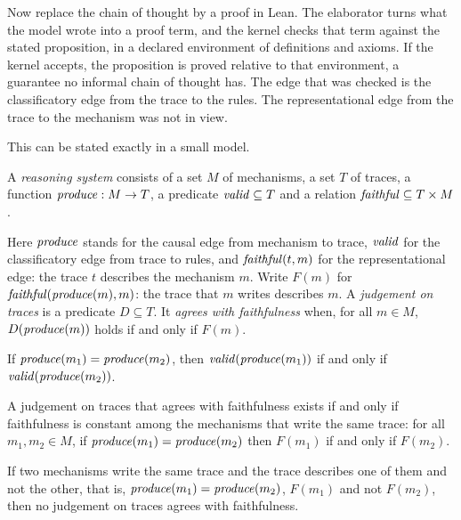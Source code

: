 Now replace the chain of thought by a proof in Lean. The elaborator turns what the model
wrote into a proof term, and the kernel checks that term against the stated proposition,
in a declared environment of definitions and axioms. If the kernel accepts, the
proposition is proved relative to that environment, a guarantee no informal chain of
thought has. The edge that was checked is the classificatory edge from the trace to the
rules. The representational edge from the trace to the mechanism was not in view.

This can be stated exactly in a small model.

\begin{definition}
\label{def:rs}
A \emph{reasoning system} consists of a set $M$ of mechanisms, a set $T$ of traces, a
function $\mathit{produce} : M \to T$, a predicate $\mathit{valid} \subseteq T$ and a relation
$\mathit{faithful} \subseteq T \times M$.
\end{definition}

\noindent
Here $\mathit{produce}$ stands for the causal edge from mechanism to trace, $\mathit{valid}$ for the
classificatory edge from trace to rules, and $\mathit{faithful}(t,m)$ for the representational
edge: the trace $t$ describes the mechanism $m$. Write $F(m)$ for
$\mathit{faithful}(\mathit{produce}(m), m)$: the trace that $m$ writes describes $m$. A \emph{judgement
on traces} is a predicate $D \subseteq T$. It \emph{agrees with faithfulness} when, for
all $m \in M$, $D(\mathit{produce}(m))$ holds if and only if $F(m)$.

\begin{proposition}
\label{prop:blind}
If $\mathit{produce}(m_1) = \mathit{produce}(m_2)$, then $\mathit{valid}(\mathit{produce}(m_1))$ if and only if
$\mathit{valid}(\mathit{produce}(m_2))$.
\end{proposition}

\begin{proposition}
\label{prop:char}
A judgement on traces that agrees with faithfulness exists if and only if faithfulness
is constant among the mechanisms that write the same trace: for all $m_1, m_2 \in M$,
if $\mathit{produce}(m_1) = \mathit{produce}(m_2)$ then $F(m_1)$ if and only if $F(m_2)$.
\end{proposition}

\begin{corollary}
\label{cor:split}
If two mechanisms write the same trace and the trace describes one of them and not the
other, that is, $\mathit{produce}(m_1) = \mathit{produce}(m_2)$, $F(m_1)$ and not $F(m_2)$, then no
judgement on traces agrees with faithfulness.
\end{corollary}

